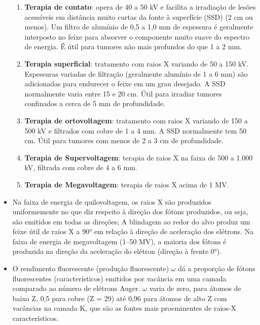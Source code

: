 \documentclass[11pt,a4paper]{article}
\newcounter{exemplo}
\begin{document}
\begin{exemplo}
\begin{itemize}
\begin{enumerate}
				\item \textbf{Terapia de contato}: opera de 40 a 50 kV e facilita a irradiação de lesões acessíveis em distância muito curtas da fonte à superfície (SSD) (2 cm ou menos). Um filtro de alumínio de 0,5 a 1,0 mm de espessura é geralmente interposto no feixe para absorver o componente muito suave do espectro de energia. É útil para tumores não mais profundos do que 1 a 2 mm.
				
				\item \textbf{Terapia superficial}: tratamento com raios X variando de 50 a 150 kV. Espessuras variadas de filtração (geralmente alumínio de 1 a 6 mm) são adicionadas para endurecer o feixe em um grau desejado. A SSD normalmente varia entre 15 e 20 cm. Útil para irradiar tumores confinados a cerca de 5 mm de profundidade.
				
				\item \textbf{Terapia de ortovoltagem}: tratamento com raios X variando de 150 a 500 kV e filtrados com cobre de 1 a 4 mm. A SSD normalmente tem 50 cm. Útil para tumores com menos de 2 a 3 cm de profundidade.
				
				\item \textbf{Terapia de Supervoltagem}: terapia de raios X na faixa de 500 a 1.000 kV, filtrada com cobre de 4 a 6 mm.
				
				\item \textbf{Terapia de Megavoltagem}: terapia de raios X acima de 1 MV.
			\end{enumerate}

		\item Na faixa de energia de quilovoltagem, os raios X são produzidos uniformemente no que diz respeito à direção dos fótons produzidos, ou seja, são emitidos em todas as direções; A blindagem ao redor do alvo produz um feixe útil de raios X a 90° em relação à direção de aceleração dos elétrons. Na faixa de energia de megavoltagem (1–50 MV), a maioria dos fótons é produzida na direção da aceleração do elétron (direção  à frente 0°).
		
		\item O rendimento fluorescente (produção fluorescente) $\omega$ dá a proporção de fótons fluorescentes (característicos) emitidos por vacância em uma camada comparado ao número de elétrons Auger. $\omega$ varia de zero, para átomos de baixo Z,  0,5 para cobre (Z = 29) até 0,96 para átomos de alto Z com vacâncias  na camada K, que são as fontes mais proeminentes de raios-X característicos.
		

\end{itemize}
\end{exemplo}
\end{document}
